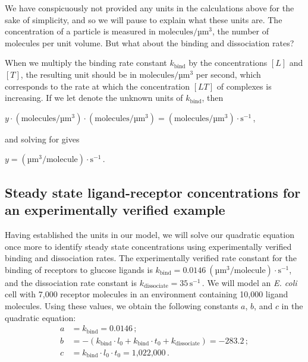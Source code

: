 We have conspicuously not provided any units in the calculations above for the sake of simplicity, and so we will pause to explain what these units are. The concentration of a particle is measured in $\text{molecules}/\text{µm}^3$, the number of molecules per unit volume. But what about the binding and dissociation rates?

When we multiply the binding rate constant $k_\text{bind}$ by the concentrations $[L]$ and $[T]$, the resulting unit should be in $\text{molecules}/\text{µm}^3$ per second, which corresponds to the rate at which the concentration $[LT]$ of complexes is increasing. If we let  denote the unknown units of $k_\text{bind}$, then

\begin{center}
$y \cdot (\text{molecules}/\text{µm}^3) \cdot (\text{molecules}/\text{µm}^3) = (\text{molecules}/\text{µm}^3) \cdot \text{s}^{-1}$\,,
\end{center}

\noindent and solving for  gives

\begin{center}
$y = (\text{µm}^3/\text{molecule}) \cdot \text{s}^{-1}$\,.
\end{center}

\fudgespace

\begin{qbox}\end{qbox}

\FloatBarrier
{}
\subsection{Steady state ligand-receptor concentrations for an experimentally verified example}

Having established the units in our model, we will solve our quadratic equation once more to identify steady state concentrations using experimentally verified binding and dissociation rates. The experimentally verified rate constant for the binding of receptors to glucose ligands is $k_\text{bind} = 0.0146~(\text{µm}^3/\text{molecule}) \cdot \text{s}^{-1}$, and the dissociation rate constant is $k_\text{dissociate} = 35\,\text{s}^{-1}$\,. We will model an \textit{E. coli} cell with 7,000 receptor molecules in an environment containing 10,000 ligand molecules. Using these values, we obtain the following constants $a$, $b$, and $c$ in the quadratic equation:
\begin{align*}
a & = k_\text{bind} = 0.0146\,;\\
b & = - (k_\text{bind} \cdot l_0 + k_\text{bind} \cdot t_0 + k_\text{dissociate}) = -283.2\,;\\
c & = k_\text{bind} \cdot l_0 \cdot t_0 = \text{1,022,000}\,.
\end{align*}

